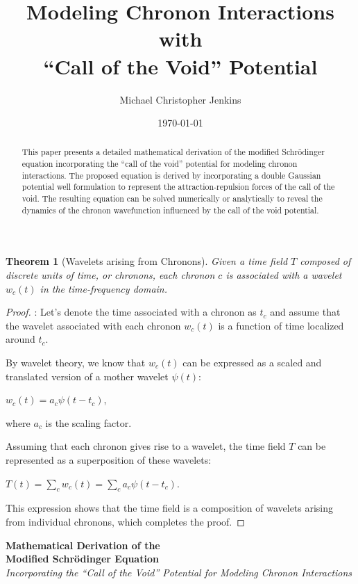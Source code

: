 \documentclass{article}
\title{Modeling Chronon Interactions with \\``Call of the Void'' Potential}
\author{Michael Christopher Jenkins}
\date{\today \\[10pt] \companyname}
\newtheorem{theorem}{Theorem}
\begin{document}
 

\maketitle

\begin{abstract}
This paper presents a detailed mathematical derivation of the modified Schrödinger equation incorporating the ``call of the void'' potential for modeling chronon interactions. The proposed equation is derived by incorporating a double Gaussian potential well formulation to represent the attraction-repulsion forces of the call of the void. The resulting equation can be solved numerically or analytically to reveal the dynamics of the chronon wavefunction influenced by the call of the void potential.
\end{abstract}

\begin{theorem}[Wavelets arising from Chronons]
Given a time field \(T\) composed of discrete units of time, or chronons, each chronon \(c\) is associated with a wavelet \(w_c(t)\) in the time-frequency domain.
\end{theorem}

\begin{proof}:
Let's denote the time associated with a chronon as \(t_c\) and assume that the wavelet associated with each chronon \(w_c(t)\) is a function of time localized around \(t_c\).

By wavelet theory, we know that \(w_c(t)\) can be expressed as a scaled and translated version of a mother wavelet \(\psi(t)\):

\(w_c(t) = a_c\psi(t - t_c)\),

where \(a_c\) is the scaling factor.

Assuming that each chronon gives rise to a wavelet, the time field \(T\) can be represented as a superposition of these wavelets:

\(T(t) = \sum_{c} w_c(t) = \sum_{c} a_c\psi(t - t_c)\).

This expression shows that the time field is a composition of wavelets arising from individual chronons, which completes the proof.
\end{proof}

\begin{center}
    \textbf{\Large Mathematical Derivation of the \\Modified Schrödinger Equation}\\[10pt]
    \textit{Incorporating the ``Call of the Void'' Potential for Modeling Chronon Interactions}
\end{center}
\end{document}
